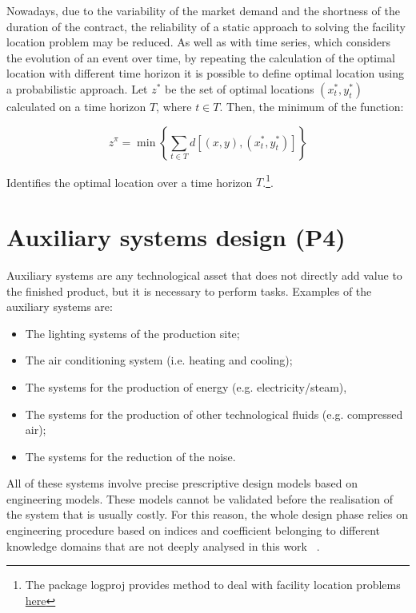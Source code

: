 Nowadays, due to the variability of the market demand and the shortness of the duration of the contract, the reliability of a static approach to solving the facility location problem may be reduced. As well as with time series, which considers the evolution of an event over time, by repeating the calculation of the optimal location with different time horizon it is possible to define optimal location using a probabilistic approach. Let $z^\ast$ be the set of optimal locations $(x_t^\ast,y_t^\ast)$ calculated on a time horizon $T$, where $t\in T$. Then, the minimum of the function:

\begin{equation}
    z^\pi=\min{\left\{\sum_{t\in T} d\left[\left(x,y\right),\left(x_t^\ast,y_t^\ast\right)\right]\right\}}
\end{equation}

Identifies the optimal location over a time horizon $T$.\footnote{The package logproj provides method to deal with facility location problems \href{https://github.com/aletuf93/logproj/blob/master/logproj/P6_placementProblem/facility_location_definition.py}{here}}.

\section{Auxiliary systems design (P4)}
Auxiliary systems are any technological asset that does not directly add value to the finished product, but it is necessary to perform tasks. Examples of the auxiliary systems are:

\begin{itemize}
    \item The lighting systems of the production site;
    \item The air conditioning system (i.e. heating and cooling);
    \item The systems for the production of energy (e.g. electricity/steam),
    \item The systems for the production of other technological fluids (e.g. compressed air);
    \item The systems for the reduction of the noise.

\end{itemize}

All of these systems involve precise prescriptive design models based on engineering models. These models cannot be validated before the realisation of the system that is usually costly. For this reason, the whole design phase relies on engineering procedure based on indices and coefficient belonging to different knowledge domains that are not deeply analysed in this work ~\cite{Colombo2012}.

